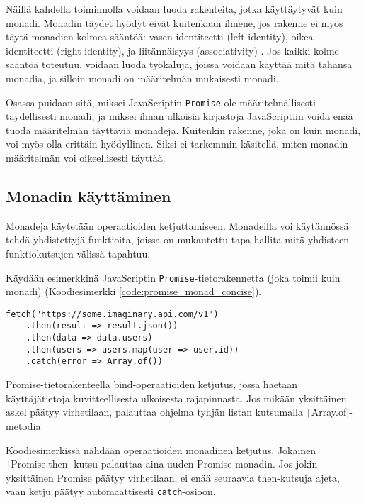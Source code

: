Näillä kahdella toiminnolla voidaan luoda rakenteita, jotka käyttäytyvät kuin monadi. Monadin täydet hyödyt eivät kuitenkaan ilmene, jos rakenne ei myös täytä monadien kolmea sääntöä: vasen identiteetti (left identity), oikea identiteetti (right identity), ja liitännäisyys (associativity) \cite{haskellmonadlaws}. Jos kaikki kolme sääntöä toteutuu, voidaan luoda työkaluja, joissa voidaan käyttää mitä tahansa monadia, ja silloin monadi on määritelmän mukaisesti monadi.

Osassa  puidaan sitä, miksei JavaScriptin \texttt{Promise} ole määritelmällisesti täydellisesti monadi, ja miksei ilman ulkoisia kirjastoja JavaScriptiin voida enää tuoda määritelmän täyttäviä monadeja. Kuitenkin rakenne, joka on kuin monadi, voi myös olla erittäin hyödyllinen. Siksi ei tarkemmin käsitellä, miten monadin määritelmän voi oikeellisesti täyttää.


\subsection{Monadin käyttäminen}

Monadeja käytetään operaatioiden ketjuttamiseen. Monadeilla voi käytännössä tehdä yhdistettyjä funktioita, joissa on mukautettu tapa hallita mitä yhdisteen funktiokutsujen välissä tapahtuu.

Käydään esimerkkinä JavaScriptin \texttt{Promise}-tietorakennetta (joka toimii kuin monadi) (Koodiesimerkki \ref{code:promise_monad_concise}).

\begin{code}
    \begin{verbatim}
fetch("https://some.imaginary.api.com/v1") 
    .then(result => result.json()) 
    .then(data => data.users)
    .then(users => users.map(user => user.id))
    .catch(error => Array.of()) 
    \end{verbatim}
    \caption{Promise-tietorakenteella bind-operaatioiden ketjutus, jossa haetaan käyttäjätietoja kuvitteellisesta ulkoisesta rajapinnasta. Jos mikään yksittäinen askel päätyy virhetilaan, palauttaa ohjelma tyhjän listan kutsumalla \texttt|Array.of|-metodia}
    \label{code:promise_monad_concise}
\end{code}

Koodiesimerkissä nähdään operaatioiden monadinen ketjutus. Jokainen \texttt|Promise.then|-kutsu palauttaa aina uuden Promise-monadin. Jos jokin yksittäinen Promise päätyy virhetilaan, ei enää seuraavia then-kutsuja ajeta, vaan ketju päätyy automaattisesti \texttt{catch}-osioon.

